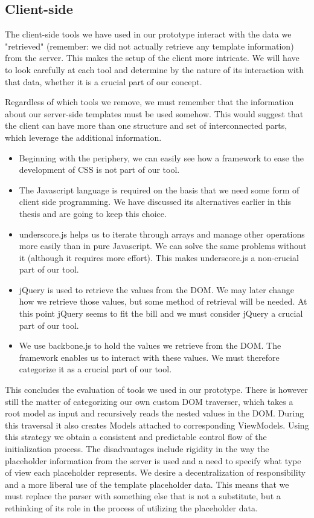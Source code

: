 \subsection{Client-side}
The client-side tools we have used in our prototype interact with the data we
"retrieved" (remember: we did not actually retrieve any template information)
from the server. This makes the setup of the client more intricate. We will have
to look carefully at each tool and determine by the nature of its interaction
with that data, whether it is a crucial part of our concept.

Regardless of which tools we remove, we must remember that the information about
our server-side templates must be used somehow. This would suggest that the
client can have more than one structure and set of interconnected parts, which
leverage the additional information.

\begin{itemize}
\item Beginning with the periphery, we can easily see how a framework to ease
the development of CSS is not part of our tool.
\item The Javascript language is required on the basis that we need some form of
client side programming. We have discussed its alternatives earlier in this
thesis and are going to keep this choice.
\item underscore.js helps us to iterate through arrays and manage other
operations more easily than in pure Javascript. We can solve the same problems
without it (although it requires more effort). This makes underscore.js a
non-crucial part of our tool.
\item jQuery is used to retrieve the values from the DOM. We may later change
how we retrieve those values, but some method of retrieval will be needed.
At this point jQuery seems to fit the bill and we must consider jQuery a crucial
part of our tool.
\item We use backbone.js to hold the values we retrieve from the DOM. The
framework enables us to interact with these values. We must therefore categorize
it as a crucial part of our tool.
\end{itemize}

This concludes the evaluation of tools we used in our prototype. There is
however still the matter of categorizing our own custom DOM traverser, which
takes a root model as input and recursively reads the nested values in the DOM.
During this traversal it also creates Models attached to corresponding
ViewModels.
Using this strategy we obtain a consistent and predictable control flow of the
initialization process. The disadvantages include rigidity in the way
the placeholder information from the server is used and a need to specify what
type of view each placeholder represents.
We desire a decentralization of responsibility and a more liberal use of
the template placeholder data. This means that we must replace the parser with
something else that is not a substitute, but a rethinking of its role in the
process of utilizing the placeholder data.

